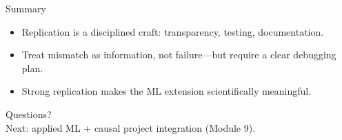 \documentclass[aspectratio=169,11pt]{beamer}
\begin{document}
\begin{frame}{Summary}
  \begin{itemize}
    \item Replication is a disciplined craft: transparency, testing, documentation.
    \item Treat mismatch as information, not failure---but require a clear debugging plan.
    \item Strong replication makes the ML extension scientifically meaningful.
  \end{itemize}
\end{frame}

\begin{frame}[plain]
  \begin{center}
    \Large Questions?\\[0.8em]
    \normalsize Next: applied ML + causal project integration (Module 9).
  \end{center}
\end{frame}
\end{document}
